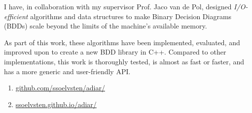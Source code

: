 
I have, in collaboration with my supervisor Prof. Jaco van de Pol, designed \emph{I/O-efficient}
algorithms and data structures to make Binary Decision Diagrams (BDDs) scale beyond the limits of
the machine's available memory.

\medskip

As part of this work, these algorithms have been implemented, evaluated, and improved upon to create
a new BDD library in C++. Compared to other implementations, this work is thoroughly tested, is
almost as fast or faster, and has a more generic and user-friendly API.

\medskip

\begin{enumerate}[leftmargin=2.5em]
\item[\indent\faGit] \href{https://github.com/ssoelvsten/adiar/}{github.com/ssoelvsten/adiar/}

\item[\indent\faFileTextO] \href{https://ssoelvsten.github.io/adiar/}{ssoelvsten.github.io/adiar/}
\end{enumerate}

\medskip
